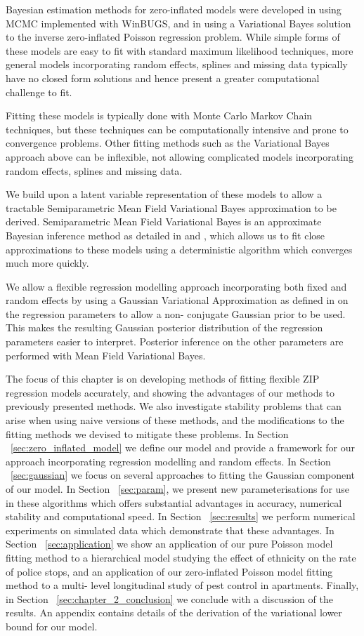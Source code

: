 Bayesian estimation methods for zero-inflated models were developed in
\cite{Ghosh2006} using MCMC implemented with WinBUGS, and in \cite{Vatsa2014}
using a Variational Bayes solution to the inverse zero-inflated Poisson
regression problem. While simple forms of these models are easy to fit with
standard  maximum likelihood techniques, more general models incorporating
random effects, splines and missing data  typically have no closed form
solutions and hence present a greater computational challenge to fit.

Fitting these models is typically done with Monte Carlo Markov Chain
techniques, but these techniques can be computationally intensive and prone to
convergence problems.  Other fitting methods such as the Variational Bayes
approach above can be inflexible, not allowing complicated models incorporating
random effects, splines and missing data.

We build upon a latent variable representation of these models to allow a
tractable Semiparametric Mean Field Variational Bayes approximation to be
derived. Semiparametric Mean Field Variational Bayes is an approximate Bayesian
inference method as detailed in \cite{Ormerod2010} and \cite{Rohde2015}, which
allows us to fit close approximations to these models using a deterministic
algorithm which converges much more quickly.

We allow a flexible regression modelling approach incorporating both fixed and
random effects by using a Gaussian Variational Approximation as defined in
\cite{Ormerod2012} on the regression parameters to allow a non- conjugate
Gaussian prior to be used. This makes the resulting Gaussian posterior
distribution of the regression parameters easier to interpret. Posterior
inference on the other parameters are performed with Mean Field Variational
Bayes.

The focus of this chapter is on developing methods of fitting flexible ZIP
regression models accurately, and showing the advantages of our methods to
previously presented methods. We also investigate stability problems that can
arise when using naive versions of these methods, and the modifications to the
fitting methods we devised to mitigate these problems. In Section
~\ref{sec:zero_inflated_model} we define our model and provide a framework for
our approach incorporating regression modelling and random effects. In Section
~\ref{sec:gaussian} we focus on several approaches to fitting the Gaussian
component of our model. In Section ~\ref{sec:param}, we present new
parameterisations for use in these algorithms which offers substantial
advantages in accuracy, numerical stability and computational speed. In Section
~\ref{sec:results} we perform numerical experiments on simulated data which
demonstrate that these advantages. In Section ~\ref{sec:application} we show an
application of our pure Poisson model fitting method to a hierarchical model
studying the effect of ethnicity on the rate of police stops, and an
application of our zero-inflated Poisson model fitting method to a multi- level
longitudinal study of pest control in apartments. Finally, in Section
~\ref{sec:chapter_2_conclusion} we conclude with a discussion of the results.
An appendix contains details of the derivation of the variational lower bound
for our model.

